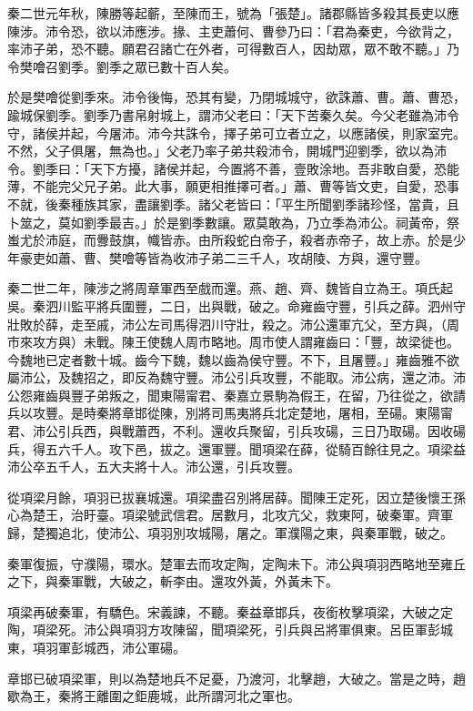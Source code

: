 \begin{pinyinscope}
秦二世元年秋，陳勝等起蘄，至陳而王，號為「張楚」。諸郡縣皆多殺其長吏以應陳涉。沛令恐，欲以沛應涉。掾、主吏蕭何、曹參乃曰：「君為秦吏，今欲背之，率沛子弟，恐不聽。願君召諸亡在外者，可得數百人，因劫眾，眾不敢不聽。」乃令樊噲召劉季。劉季之眾已數十百人矣。

於是樊噲從劉季來。沛令後悔，恐其有變，乃閉城城守，欲誅蕭、曹。蕭、曹恐，踰城保劉季。劉季乃書帛射城上，謂沛父老曰：「天下苦秦久矣。今父老雖為沛令守，諸侯并起，今屠沛。沛今共誅令，擇子弟可立者立之，以應諸侯，則家室完。不然，父子俱屠，無為也。」父老乃率子弟共殺沛令，開城門迎劉季，欲以為沛令。劉季曰：「天下方擾，諸侯并起，今置將不善，壹敗涂地。吾非敢自愛，恐能薄，不能完父兄子弟。此大事，願更相推擇可者。」蕭、曹等皆文吏，自愛，恐事不就，後秦種族其家，盡讓劉季。諸父老皆曰：「平生所聞劉季諸珍怪，當貴，且卜筮之，莫如劉季最吉。」於是劉季數讓。眾莫敢為，乃立季為沛公。祠黃帝，祭蚩尤於沛庭，而釁鼓旗，幟皆赤。由所殺蛇白帝子，殺者赤帝子，故上赤。於是少年豪吏如蕭、曹、樊噲等皆為收沛子弟二三千人，攻胡陵、方與，還守豐。

秦二世二年，陳涉之將周章軍西至戲而還。燕、趙、齊、魏皆自立為王。項氏起吳。秦泗川監平將兵圍豐，二日，出與戰，破之。命雍齒守豐，引兵之薛。泗州守壯敗於薛，走至戚，沛公左司馬得泗川守壯，殺之。沛公還軍亢父，至方與，（周市來攻方與）未戰。陳王使魏人周市略地。周市使人謂雍齒曰：「豐，故梁徙也。今魏地已定者數十城。齒今下魏，魏以齒為侯守豐。不下，且屠豐。」雍齒雅不欲屬沛公，及魏招之，即反為魏守豐。沛公引兵攻豐，不能取。沛公病，還之沛。沛公怨雍齒與豐子弟叛之，聞東陽甯君、秦嘉立景駒為假王，在留，乃往從之，欲請兵以攻豐。是時秦將章邯從陳，別將司馬夷將兵北定楚地，屠相，至碭。東陽甯君、沛公引兵西，與戰蕭西，不利。還收兵聚留，引兵攻碭，三日乃取碭。因收碭兵，得五六千人。攻下邑，拔之。還軍豐。聞項梁在薛，從騎百餘往見之。項梁益沛公卒五千人，五大夫將十人。沛公還，引兵攻豐。

從項梁月餘，項羽已拔襄城還。項梁盡召別將居薛。聞陳王定死，因立楚後懷王孫心為楚王，治盱臺。項梁號武信君。居數月，北攻亢父，救東阿，破秦軍。齊軍歸，楚獨追北，使沛公、項羽別攻城陽，屠之。軍濮陽之東，與秦軍戰，破之。

秦軍復振，守濮陽，環水。楚軍去而攻定陶，定陶未下。沛公與項羽西略地至雍丘之下，與秦軍戰，大破之，斬李由。還攻外黃，外黃未下。

項梁再破秦軍，有驕色。宋義諫，不聽。秦益章邯兵，夜銜枚擊項梁，大破之定陶，項梁死。沛公與項羽方攻陳留，聞項梁死，引兵與呂將軍俱東。呂臣軍彭城東，項羽軍彭城西，沛公軍碭。

章邯已破項梁軍，則以為楚地兵不足憂，乃渡河，北擊趙，大破之。當是之時，趙歇為王，秦將王離圍之鉅鹿城，此所謂河北之軍也。


\end{pinyinscope}
